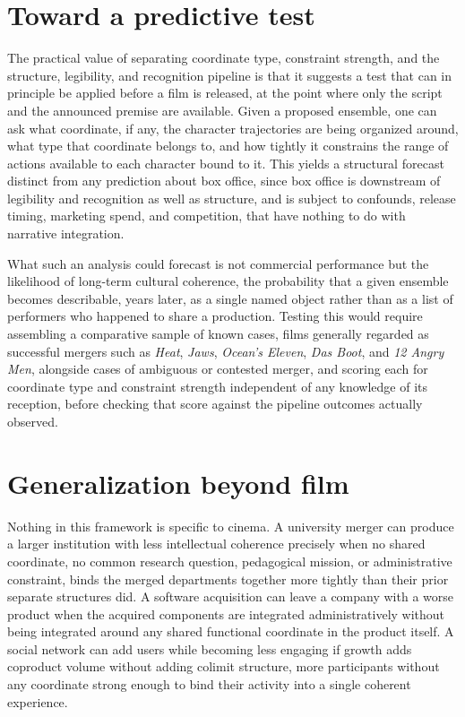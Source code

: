 \documentclass[11pt]{article}
\begin{document}
\section{Toward a predictive test}

The practical value of separating coordinate type, constraint strength, and the structure, legibility, and recognition pipeline is that it suggests a test that can in principle be applied before a film is released, at the point where only the script and the announced premise are available. Given a proposed ensemble, one can ask what coordinate, if any, the character trajectories are being organized around, what type that coordinate belongs to, and how tightly it constrains the range of actions available to each character bound to it. This yields a structural forecast distinct from any prediction about box office, since box office is downstream of legibility and recognition as well as structure, and is subject to confounds, release timing, marketing spend, and competition, that have nothing to do with narrative integration.

What such an analysis could forecast is not commercial performance but the likelihood of long-term cultural coherence, the probability that a given ensemble becomes describable, years later, as a single named object rather than as a list of performers who happened to share a production. Testing this would require assembling a comparative sample of known cases, films generally regarded as successful mergers such as \emph{Heat}, \emph{Jaws}, \emph{Ocean's Eleven}, \emph{Das Boot}, and \emph{12 Angry Men}, alongside cases of ambiguous or contested merger, and scoring each for coordinate type and constraint strength independent of any knowledge of its reception, before checking that score against the pipeline outcomes actually observed.

\section{Generalization beyond film}

Nothing in this framework is specific to cinema. A university merger can produce a larger institution with less intellectual coherence precisely when no shared coordinate, no common research question, pedagogical mission, or administrative constraint, binds the merged departments together more tightly than their prior separate structures did. A software acquisition can leave a company with a worse product when the acquired components are integrated administratively without being integrated around any shared functional coordinate in the product itself. A social network can add users while becoming less engaging if growth adds coproduct volume without adding colimit structure, more participants without any coordinate strong enough to bind their activity into a single coherent experience.
\end{document}

